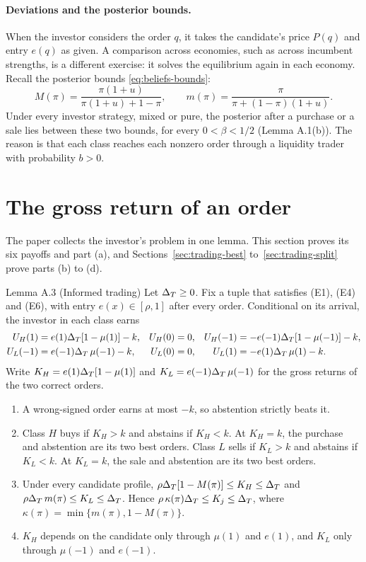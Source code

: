 \paragraph{Deviations and the posterior bounds.} When the investor considers the order \(q\), it takes the
candidate's price \(P(q)\) and entry \(e(q)\) as given. A comparison across economies, such as across incumbent
strengths, is a different exercise: it solves the equilibrium again in each economy. Recall the posterior bounds
\eqref{eq:beliefs-bounds}:
\[
M(\pi)=\frac{\pi(1+u)}{\pi(1+u)+1-\pi},\qquad m(\pi)=\frac{\pi}{\pi+(1-\pi)(1+u)} .
\]
Under every investor strategy, mixed or pure, the posterior after a purchase or a sale lies between these two
bounds, for every \(0<\beta<1/2\) (Lemma A.1(b)). The reason is that each class reaches each nonzero order through
a liquidity trader with probability \(b>0\).

\section{The gross return of an order}\label{sec:trading-returns}

The paper collects the investor's problem in one lemma. This section proves its six payoffs and part (a), and
Sections~\ref{sec:trading-best} to~\ref{sec:trading-split} prove parts (b) to (d).

\begin{paperresult}{Lemma A.3 (Informed trading)}
Let \(\Delta_T\ge0\). Fix a tuple that satisfies (E1), (E4) and (E6), with entry \(e(x)\in[\rho,1]\) after every order.
Conditional on its arrival, the investor in each class earns
\[
\begin{aligned}
U_H(1)&=e(1)\Delta_T[1-\mu(1)]-k,& U_H(0)&=0,& U_H(-1)&=-e(-1)\Delta_T[1-\mu(-1)]-k,\\
U_L(-1)&=e(-1)\Delta_T\,\mu(-1)-k,& U_L(0)&=0,& U_L(1)&=-e(1)\Delta_T\,\mu(1)-k.
\end{aligned}
\]
Write \(K_H=e(1)\Delta_T[1-\mu(1)]\) and \(K_L=e(-1)\Delta_T\,\mu(-1)\) for the gross returns of the two correct orders.
\begin{enumerate}[label=(\alph*)]
\item A wrong-signed order earns at most \(-k\), so abstention strictly beats it.
\item Class \(H\) buys if \(K_H>k\) and abstains if \(K_H<k\). At \(K_H=k\), the purchase and abstention are its two
best orders. Class \(L\) sells if \(K_L>k\) and abstains if \(K_L<k\). At \(K_L=k\), the sale and abstention are
its two best orders.
\item Under every candidate profile, \(\rho\Delta_T[1-M(\pi)]\le K_H\le\Delta_T\) and \(\rho\Delta_T\,m(\pi)\le K_L\le\Delta_T\).
Hence \(\rho\,\kappa(\pi)\Delta_T\le K_j\le\Delta_T\), where \(\kappa(\pi)=\min\{m(\pi),1-M(\pi)\}\).
\item \(K_H\) depends on the candidate only through \(\mu(1)\) and \(e(1)\), and \(K_L\) only through \(\mu(-1)\)
and \(e(-1)\).
\end{enumerate}
\end{paperresult}

